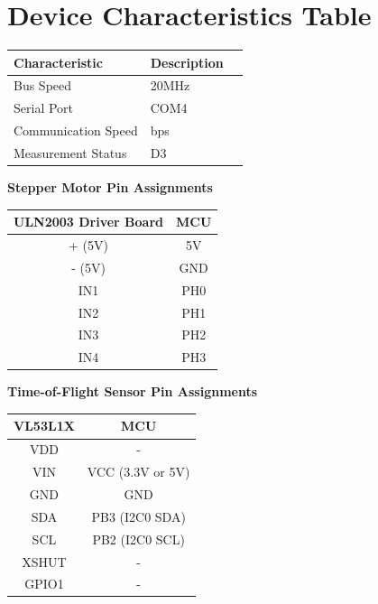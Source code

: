 \documentclass[12pt, letterpaper]{article}
\begin{document}
\section{Device Characteristics Table}
\begin{center}
\begin{tabularx}{0.5\textwidth}{|>{\centering\arraybackslash}X|>{\centering\arraybackslash}X|>{\centering\arraybackslash}X|}
\hline
\textbf{Characteristic} & \textbf{Description} \\
\hline
Bus Speed & 20MHz \\
\hline
Serial Port & COM4 \\
\hline
Communication Speed & 115200 bps \\
\hline
Measurement Status & D3 \\
\hline
\end{tabularx}
\end{center}

\begin{minipage}{0.48\textwidth}
\centering
\textbf{Stepper Motor Pin Assignments}
\begin{tabular}{|c|c|}
\hline
\textbf{ULN2003 Driver Board} & \textbf{MCU} \\
\hline
+ (5V) & 5V \\
\hline
- (5V) & GND \\
\hline
IN1 & PH0 \\
\hline
IN2 & PH1 \\
\hline
IN3 & PH2 \\
\hline
IN4 & PH3 \\
\hline
\end{tabular}
\end{minipage}
\hfill
\begin{minipage}{0.48\textwidth}
\centering
\textbf{Time-of-Flight Sensor Pin Assignments}
\begin{tabular}{|c|c|}
\hline
\textbf{VL53L1X} & \textbf{MCU} \\
\hline
VDD & - \\
\hline
VIN & VCC (3.3V or 5V) \\
\hline
GND & GND \\
\hline
SDA & PB3 (I2C0 SDA) \\
\hline
SCL & PB2 (I2C0 SCL)  \\
\hline
XSHUT & - \\
\hline
GPIO1 & - \\
\hline
\end{tabular}
\end{minipage}
\end{document}
